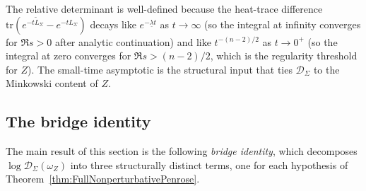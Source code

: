 The relative determinant is well-defined because the heat-trace difference $\mathrm{tr}(e^{-t\tilde L_\Sigma}-e^{-tL_\Sigma})$ decays like $e^{-\underline\lambda t}$ as $t\to\infty$ (so the integral at infinity converges for $\Re s>0$ after analytic continuation) and like $t^{-(n-2)/2}$ as $t\to0^+$ (so the integral at zero converges for $\Re s>(n-2)/2$, which is the regularity threshold for $Z$). The small-time asymptotic is the structural input that ties $\mathscr D_\Sigma$ to the Minkowski content of $Z$.

\subsection{The bridge identity}

The main result of this section is the following \emph{bridge identity}, which decomposes $\log\mathscr D_\Sigma(\omega_Z)$ into three structurally distinct terms, one for each hypothesis of Theorem~\ref{thm:FullNonperturbativePenrose}.

